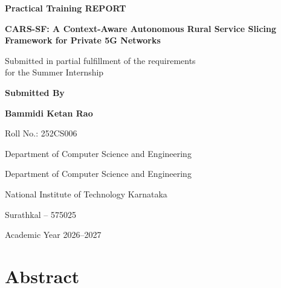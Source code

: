 \documentclass[12pt,a4paper]{report}
\begin{document}
\begin{titlepage}
	
	\begin{center}
		
		\vspace*{1cm}
		
		{\Large \textbf{Practical Training REPORT}}
		
		\vspace{1.3cm}
		
		{\Large
			\textbf{CARS-SF: A Context-Aware Autonomous Rural Service Slicing Framework for Private 5G Networks}
		}
		
		\vspace{2cm}
		
		Submitted in partial fulfillment of the requirements\\
		for the Summer Internship
		
		\vspace{1.8cm}
		
		\textbf{Submitted By}
		
		\vspace{0.4cm}
		
		\textbf{Bammidi Ketan Rao}
		
		Roll No.: 252CS006
		
		Department of Computer Science and Engineering
		
		\vspace{1.8cm}
		
		
		\vfill
		
		
		\vspace{0.6cm}
		
		Department of Computer Science and Engineering
		
		National Institute of Technology Karnataka
		
		Surathkal -- 575025
		
		\vspace{0.8cm}
		
		Academic Year 2026--2027
		
	\end{center}
	
\end{titlepage}



	
\chapter*{Abstract}
\end{document}
